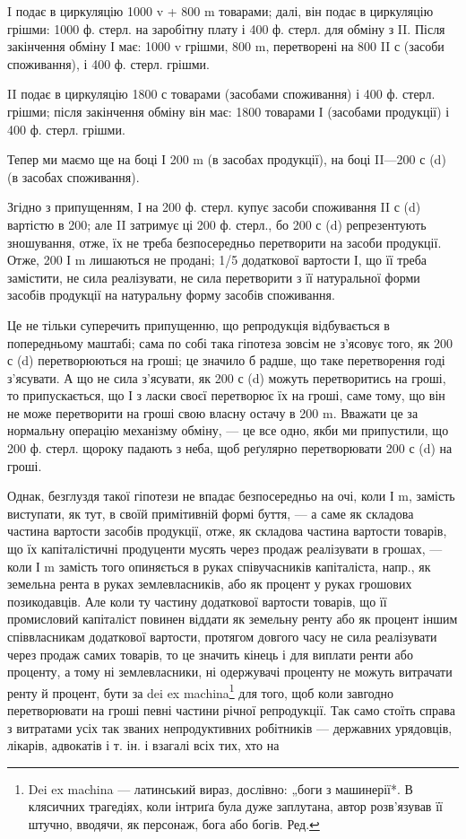 \parcont{}  %
I подає в циркуляцію 1000 v + 800 m товарами; далі, він подає
в циркуляцію грішми: 1000 ф. стерл. на заробітну плату і 400 ф. стерл.
для обміну з II. Після закінчення обміну І має: 1000 v грішми, 800 m,
перетворені на 800 II с (засоби споживання), і 400 ф. стерл. грішми.

II подає в циркуляцію 1800 с товарами (засобами споживання) і
400 ф. стерл. грішми; після закінчення обміну він має: 1800 товарами І
(засобами продукції) і 400 ф. стерл. грішми.

Тепер ми маємо ще на боці І 200 m (в засобах продукції), на боці
II—200 с (d) (в засобах споживання).

Згідно з припущенням, І на 200 ф. стерл. купує засоби споживання
II с (d) вартістю в 200; але II затримує ці 200 ф. стерл., бо 200 с (d)
репрезентують зношування, отже, їх не треба безпосередньо перетворити
на засоби продукції. Отже, 200 І m лишаються не продані;
1/5 додаткової вартости І, що її треба замістити, не сила реалізувати, не
сила перетворити з її натуральної форми засобів продукції на натуральну
форму засобів споживання.

Це не тільки суперечить припущенню, що репродукція відбувається
в попередньому маштабі; сама по собі така гіпотеза зовсім не з’ясовує
того, як 200 с (d) перетворюються на гроші; це значило б радше, що
таке перетворення годі з’ясувати. А що не сила з’ясувати, як 200 с (d)
можуть перетворитись на гроші, то припускається, що І з ласки своєї
перетворює їх на гроші, саме тому, що він не може перетворити на гроші
свою власну остачу в 200 m. Вважати це за нормальну операцію механізму
обміну, — це все одно, якби ми припустили, що 200 ф. стерл.
щороку падають з неба, щоб реґулярно перетворювати 200 с (d) на гроші.

Однак, безглуздя такої гіпотези не впадає безпосередньо на очі, коли І m,
замість виступати, як тут, в своїй примітивній формі буття, — а саме як
складова частина вартости засобів продукції, отже, як складова частина
вартости товарів, що їх капіталістичні продуценти мусять через продаж
реалізувати в грошах, — коли І m замість того опиняється в руках співучасників
капіталіста, напр., як земельна рента в руках землевласників,
або як процент у руках грошових позикодавців. Але коли ту частину додаткової
вартости товарів, що її промисловий капіталіст повинен віддати
як земельну ренту або як процент іншим співвласникам додаткової вартости,
протягом довгого часу не сила реалізувати через продаж самих
товарів, то це значить кінець і для виплати ренти або проценту, а тому
ні землевласники, ні одержувачі проценту не можуть витрачати ренту й
процент, бути за dei ex machina\footnote*{
Dei ex machina — латинський вираз, дослівно: „боги з машинерії*. В клясичних
трагедіях, коли інтриґа була дуже заплутана, автор розв’язував її штучно,
вводячи, як персонаж, бога або богів. Ред.
} для того, щоб коли завгодно перетворювати
на гроші певні частини річної репродукції. Так само стоїть
справа з витратами усіх так званих непродуктивних робітників — державних
урядовців, лікарів, адвокатів і т. ін. і взагалі всіх тих, хто на
\parbreak{}  %

